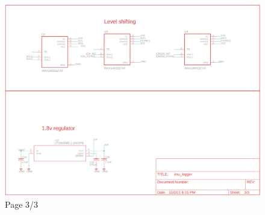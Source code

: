 \documentclass{article}
\begin{document}
\begin{figure}[H]
	\centering
	\includegraphics[width=\textwidth]{images/imu_logger_schem_3}
	\caption{Page 3/3}
	\label{fig:schematic-imu-p3}
\end{figure}




%
%
\end{document}
